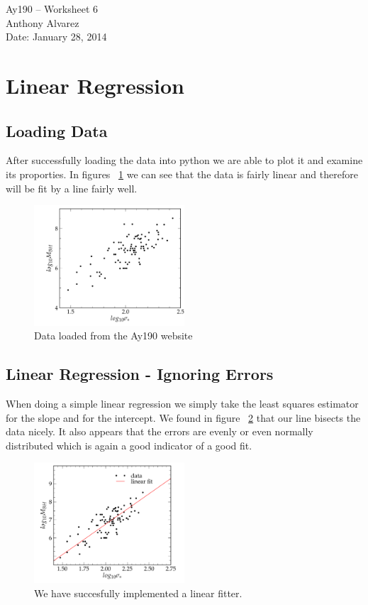 \documentclass[11pt,letterpaper]{article}
\begin{document}
\begin{center}
\Large
Ay190 -- Worksheet 6\\
Anthony Alvarez\\
Date: January 28, 2014
\end{center}

\section{Linear Regression}
\subsection{Loading Data}

After successfully loading the data into python we are able to plot it and 
examine its proporties. In figures ~\ref{fig:data} we can see that the data 
is fairly linear and therefore will be fit by a line fairly well.

\begin{figure}[bth]
\centering
\includegraphics[width=0.5\textwidth]{1a.pdf}
\caption{Data loaded from the Ay190 website}
\label{fig:data}
\end{figure}

\subsection{Linear Regression - Ignoring Errors}

When doing a simple linear regression we simply take the least squares estimator
for the slope and for the intercept. We found in figure ~\ref{fig:linreg} 
that our line bisects the data nicely. It also appears that the errors are
evenly or even normally distributed which is again a good indicator of a good 
fit.

\begin{figure}[bth]
\centering
\includegraphics[width=0.5\textwidth]{1b.pdf}
\caption{We have succesfully implemented a linear fitter.}
\label{fig:linreg}
\end{figure}
\end{document}

